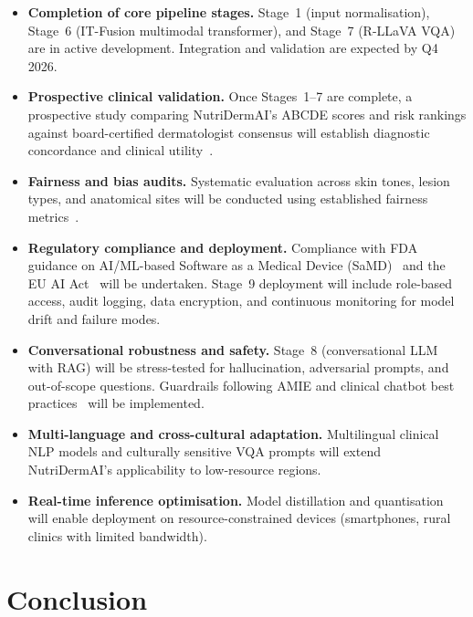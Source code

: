 \documentclass[conference]{IEEEtran}
\begin{document}
\begin{itemize}[leftmargin=*]
    \item \textbf{Completion of core pipeline stages.} Stage~1 (input normalisation),
          Stage~6 (IT-Fusion multimodal transformer), and Stage~7 (R-LLaVA VQA) are
          in active development. Integration and validation are expected by Q4 2026.
    \item \textbf{Prospective clinical validation.} Once Stages~1--7 are complete,
          a prospective study comparing NutriDermAI's ABCDE scores and risk rankings
          against board-certified dermatologist consensus will establish diagnostic
          concordance and clinical utility~\cite{tjoa2019_clinical_validation_ai}.
    \item \textbf{Fairness and bias audits.} Systematic evaluation across skin tones,
          lesion types, and anatomical sites will be conducted using established
          fairness metrics~\cite{kinyanjui2021_color_bias_skin,buolamwini2019_gender_shades}.
    \item \textbf{Regulatory compliance and deployment.} Compliance with FDA guidance
          on AI/ML-based Software as a Medical Device (SaMD)~\cite{fda2021_aiml_samd}
          and the EU AI Act~\cite{euaiact2024} will be undertaken. Stage~9 deployment
          will include role-based access, audit logging, data encryption, and continuous
          monitoring for model drift and failure modes.
    \item \textbf{Conversational robustness and safety.} Stage~8 (conversational LLM
          with RAG) will be stress-tested for hallucination, adversarial prompts, and
          out-of-scope questions. Guardrails following AMIE and clinical chatbot best
          practices~\cite{amie2025,dermatologychatbot2024} will be implemented.
    \item \textbf{Multi-language and cross-cultural adaptation.} Multilingual clinical
          NLP models and culturally sensitive VQA prompts will extend NutriDermAI's
          applicability to low-resource regions.
    \item \textbf{Real-time inference optimisation.} Model distillation and quantisation
          will enable deployment on resource-constrained devices (smartphones, rural
          clinics with limited bandwidth).
\end{itemize}

\section{Conclusion}
\end{document}
